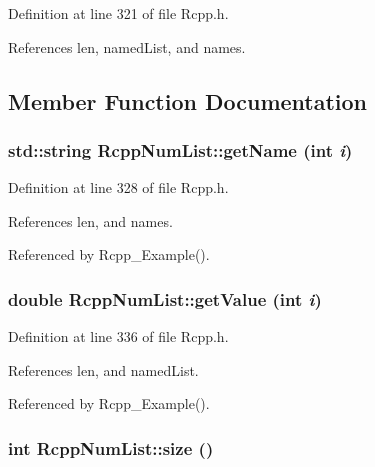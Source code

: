Definition at line 321 of file Rcpp.h.

References len, namedList, and names.

\subsection{Member Function Documentation}
\hypertarget{classRcppNumList_246d8e534d97fbe798b8567bbfa93ca7}{
\subsubsection[{getName}]{\setlength{\rightskip}{0pt plus 5cm}std::string RcppNumList::getName (int {\em i})}}
\label{classRcppNumList_246d8e534d97fbe798b8567bbfa93ca7}




Definition at line 328 of file Rcpp.h.

References len, and names.

Referenced by Rcpp\_\-Example().\hypertarget{classRcppNumList_2e83950933ddc73ad64ed800f6f5e23b}{
\subsubsection[{getValue}]{\setlength{\rightskip}{0pt plus 5cm}double RcppNumList::getValue (int {\em i})}}
\label{classRcppNumList_2e83950933ddc73ad64ed800f6f5e23b}




Definition at line 336 of file Rcpp.h.

References len, and namedList.

Referenced by Rcpp\_\-Example().\hypertarget{classRcppNumList_18dc0660cc827bcf17d9738cb5874db7}{
\subsubsection[{size}]{\setlength{\rightskip}{0pt plus 5cm}int RcppNumList::size ()}}
\label{classRcppNumList_18dc0660cc827bcf17d9738cb5874db7}




